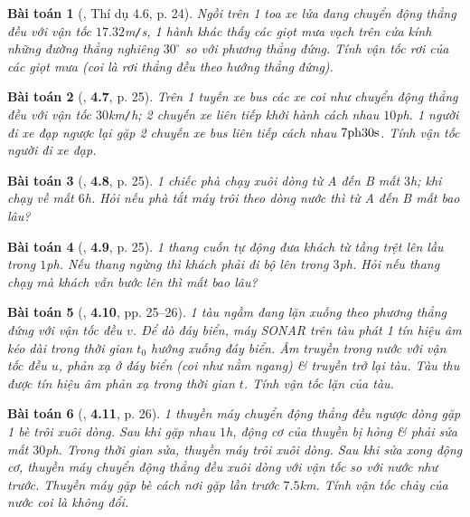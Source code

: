 \documentclass{article}
\numberwithin{equation}{section}
\newtheorem{baitoan}{Bài toán}[section]
\begin{document}
\begin{baitoan}[\cite{Giai_Toan_Vat_Ly_10_tap_1}, Thí dụ 4.6, p. 24]
	Ngồi trên 1 toa xe lửa đang chuyển động thẳng đều với vận tốc $17.32$\emph{m\texttt{/}s}, 1 hành khác thấy các giọt mưa vạch trên cửa kính những đường thẳng nghiêng $30^\circ$ so với phương thẳng đứng. Tính vận tốc rơi của các giọt mưa (coi là rơi thẳng đều theo hướng thẳng đứng).
\end{baitoan}

\begin{baitoan}[\cite{Giai_Toan_Vat_Ly_10_tap_1}, \textbf{4.7}, p. 25]
	Trên 1 tuyến xe bus các xe coi như chuyển động thẳng đều với vận tốc $30$\emph{km\texttt{/}h}; 2 chuyến xe liên tiếp khởi hành cách nhau $10$\emph{ph}. 1 người đi xe đạp ngược lại gặp 2 chuyến xe bus liên tiếp cách nhau $\rm 7ph30s$. Tính vận tốc người đi xe đạp.
\end{baitoan}

\begin{baitoan}[\cite{Giai_Toan_Vat_Ly_10_tap_1}, \textbf{4.8}, p. 25]
	1 chiếc phà chạy xuôi dòng từ A đến B mất $3$\emph{h}; khi chạy về mất $6$\emph{h}. Hỏi nếu phà tắt máy trôi theo dòng nước thì từ A đến B mất bao lâu?
\end{baitoan}

\begin{baitoan}[\cite{Giai_Toan_Vat_Ly_10_tap_1}, \textbf{4.9}, p. 25]
	1 thang cuốn tự động đưa khách từ tầng trệt lên lầu trong $1$\emph{ph}. Nếu thang ngừng thì khách phải đi bộ lên trong $3$\emph{ph}. Hỏi nếu thang chạy mà khách vẫn bước lên thì mất bao lâu?
\end{baitoan}

\begin{baitoan}[\cite{Giai_Toan_Vat_Ly_10_tap_1}, \textbf{4.10}, pp. 25--26]
	1 tàu ngầm đang lặn xuống theo phương thẳng đứng với vận tốc đều $v$. Để dò đáy biển, máy SONAR trên tàu phát 1 tín hiệu âm kéo dài trong thời gian $t_0$ hướng xuống đáy biển. Âm truyền trong nước với vận tốc đều $u$, phản xạ ở đáy biển (coi như nằm ngang) \& truyền trở lại tàu. Tàu thu được tín hiệu âm phản xạ trong thời gian $t$. Tính vận tốc lặn của tàu.
\end{baitoan}

\begin{baitoan}[\cite{Giai_Toan_Vat_Ly_10_tap_1}, \textbf{4.11}, p. 26]
	1 thuyền máy chuyển động thẳng đều \textit{ngược dòng} gặp 1 bè trôi xuôi dòng. Sau khi gặp nhau $1$\emph{h}, động cơ của thuyền bị hỏng \& phải sửa mất $30$\emph{ph}. Trong thời gian sửa, thuyền máy trôi xuôi dòng. Sau khi sửa xong động cơ, thuyền máy chuyển động thẳng đều xuôi dòng với vận tốc so với nước như trước. Thuyền máy gặp bè cách nơi gặp lần trước $7.5$\emph{km}. Tính vận tốc chảy của nước coi là không đổi.
\end{baitoan}
\end{document}
